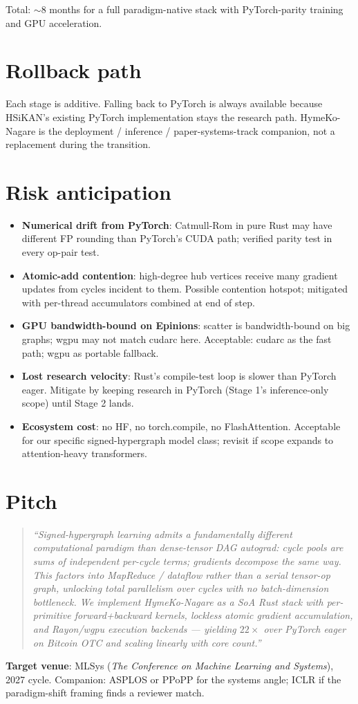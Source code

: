 \documentclass[10pt]{article}
\begin{document}
Total: $\sim$8 months for a full paradigm-native stack with PyTorch-parity
training and GPU acceleration.

\section*{Rollback path}

Each stage is additive. Falling back to PyTorch is always available
because HSiKAN's existing PyTorch implementation stays the research
path. HymeKo-Nagare is the deployment / inference / paper-systems-track
companion, not a replacement during the transition.

\section*{Risk anticipation}

\begin{itemize}
  \item \textbf{Numerical drift from PyTorch}: Catmull-Rom in pure Rust
    may have different FP rounding than PyTorch's CUDA path; verified
    parity test in every op-pair test.
  \item \textbf{Atomic-add contention}: high-degree hub vertices receive
    many gradient updates from cycles incident to them. Possible
    contention hotspot; mitigated with per-thread accumulators
    combined at end of step.
  \item \textbf{GPU bandwidth-bound on Epinions}: scatter is
    bandwidth-bound on big graphs; wgpu may not match cudarc here.
    Acceptable: cudarc as the fast path; wgpu as portable fallback.
  \item \textbf{Lost research velocity}: Rust's compile-test loop is
    slower than PyTorch eager. Mitigate by keeping research in PyTorch
    (Stage 1's inference-only scope) until Stage 2 lands.
  \item \textbf{Ecosystem cost}: no HF, no torch.compile, no FlashAttention.
    Acceptable for our specific signed-hypergraph model class; revisit
    if scope expands to attention-heavy transformers.
\end{itemize}

\section*{Pitch}

\begin{quote}
\emph{``Signed-hypergraph learning admits a fundamentally different
computational paradigm than dense-tensor DAG autograd: cycle pools are
sums of independent per-cycle terms; gradients decompose the same way.
This factors into MapReduce / dataflow rather than a serial tensor-op
graph, unlocking total parallelism over cycles with no batch-dimension
bottleneck. We implement HymeKo-Nagare as a SoA Rust stack with per-primitive
forward+backward kernels, lockless atomic gradient accumulation, and
Rayon/wgpu execution backends --- yielding $22\times$ over PyTorch eager
on Bitcoin OTC and scaling linearly with core count.''}
\end{quote}

\textbf{Target venue}: MLSys (\textit{The Conference on Machine
Learning and Systems}), 2027 cycle. Companion: ASPLOS or PPoPP for
the systems angle; ICLR if the paradigm-shift framing finds a reviewer
match.
\end{document}
